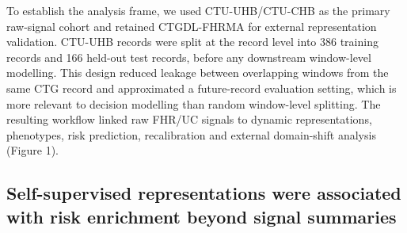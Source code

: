 \documentclass[utf8]{FrontiersinHarvard}
\begin{document}
To establish the analysis frame, we used CTU-UHB/CTU-CHB as the primary raw-signal cohort and retained CTGDL-FHRMA for external representation validation. CTU-UHB records were split at the record level into 386 training records and 166 held-out test records, before any downstream window-level modelling. This design reduced leakage between overlapping windows from the same CTG record and approximated a future-record evaluation setting, which is more relevant to decision modelling than random window-level splitting. The resulting workflow linked raw FHR/UC signals to dynamic representations, phenotypes, risk prediction, recalibration and external domain-shift analysis (Figure 1).

\subsection{Self-supervised representations were associated with risk enrichment beyond signal summaries}
\end{document}
